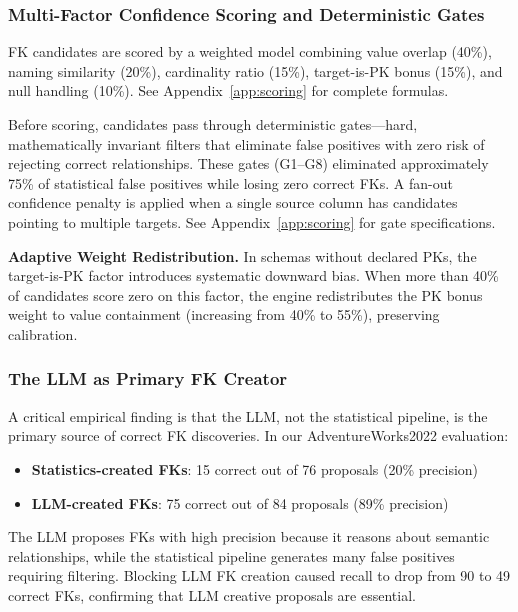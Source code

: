 \documentclass[sigconf, nonacm]{acmart}
\begin{document}
\subsubsection{Multi-Factor Confidence Scoring and Deterministic Gates}

FK candidates are scored by a weighted model combining value overlap (40\%), naming similarity (20\%), cardinality ratio (15\%), target-is-PK bonus (15\%), and null handling (10\%). See Appendix~\ref{app:scoring} for complete formulas.

Before scoring, candidates pass through deterministic gates---hard, mathematically invariant filters that eliminate false positives with zero risk of rejecting correct relationships. These gates (G1--G8) eliminated approximately 75\% of statistical false positives while losing zero correct FKs. A fan-out confidence penalty is applied when a single source column has candidates pointing to multiple targets. See Appendix~\ref{app:scoring} for gate specifications.

\textbf{Adaptive Weight Redistribution.} In schemas without declared PKs, the target-is-PK factor introduces systematic downward bias. When more than 40\% of candidates score zero on this factor, the engine redistributes the PK bonus weight to value containment (increasing from 40\% to 55\%), preserving calibration.

\subsubsection{The LLM as Primary FK Creator}

A critical empirical finding is that the LLM, not the statistical pipeline, is the primary source of correct FK discoveries. In our AdventureWorks2022 evaluation:

\begin{itemize}
    \item \textbf{Statistics-created FKs}: 15 correct out of 76 proposals (20\% precision)
    \item \textbf{LLM-created FKs}: 75 correct out of 84 proposals (89\% precision)
\end{itemize}

The LLM proposes FKs with high precision because it reasons about semantic relationships, while the statistical pipeline generates many false positives requiring filtering. Blocking LLM FK creation caused recall to drop from 90 to 49 correct FKs, confirming that LLM creative proposals are essential.
\end{document}
